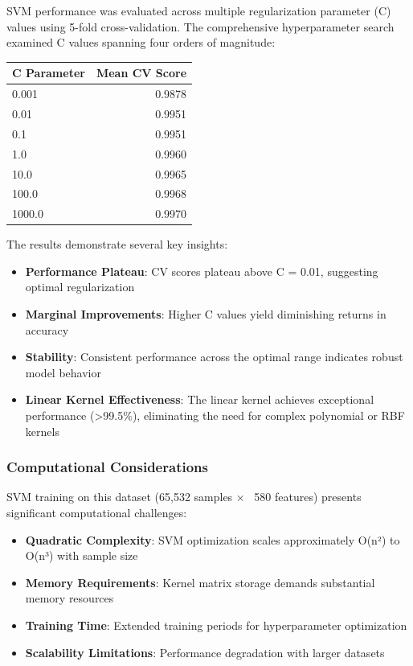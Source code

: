 \documentclass[12pt,a4paper]{article}
\begin{document}
SVM performance was evaluated across multiple regularization parameter (C) values using 5-fold cross-validation. The comprehensive hyperparameter search examined C values spanning four orders of magnitude:

\begin{center}
\begin{tabular}{|l|r|}
\hline
\textbf{C Parameter} & \textbf{Mean CV Score} \\
\hline
0.001 & 0.9878 \\
\hline
0.01 & 0.9951 \\
\hline
0.1 & 0.9951 \\
\hline
1.0 & 0.9960 \\
\hline
10.0 & 0.9965 \\
\hline
100.0 & 0.9968 \\
\hline
1000.0 & 0.9970 \\
\hline
\end{tabular}
\end{center}

The results demonstrate several key insights:

\begin{itemize}
    \item \textbf{Performance Plateau}: CV scores plateau above C = 0.01, suggesting optimal regularization
    \item \textbf{Marginal Improvements}: Higher C values yield diminishing returns in accuracy
    \item \textbf{Stability}: Consistent performance across the optimal range indicates robust model behavior
    \item \textbf{Linear Kernel Effectiveness}: The linear kernel achieves exceptional performance (>99.5\%), eliminating the need for complex polynomial or RBF kernels
\end{itemize}

\subsubsection{Computational Considerations}

SVM training on this dataset (65,532 samples × ~580 features) presents significant computational challenges:

\begin{itemize}
    \item \textbf{Quadratic Complexity}: SVM optimization scales approximately O(n²) to O(n³) with sample size
    \item \textbf{Memory Requirements}: Kernel matrix storage demands substantial memory resources
    \item \textbf{Training Time}: Extended training periods for hyperparameter optimization
    \item \textbf{Scalability Limitations}: Performance degradation with larger datasets
\end{itemize}
\end{document}
